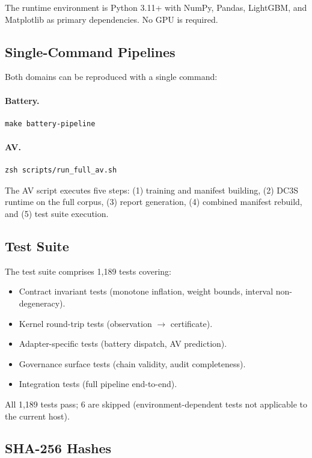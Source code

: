 The runtime environment is Python 3.11+ with NumPy, Pandas, LightGBM, and
Matplotlib as primary dependencies.  No GPU is required.

\subsection{Single-Command Pipelines}

Both domains can be reproduced with a single command:

\paragraph{Battery.}
\begin{verbatim}
make battery-pipeline
\end{verbatim}

\paragraph{AV.}
\begin{verbatim}
zsh scripts/run_full_av.sh
\end{verbatim}

The AV script executes five steps: (1) training and manifest building,
(2) DC3S runtime on the full corpus, (3) report generation, (4) combined manifest
rebuild, and (5) test suite execution.

\subsection{Test Suite}

The test suite comprises 1{,}189 tests covering:
\begin{itemize}[nosep]
  \item Contract invariant tests (monotone inflation, weight bounds, interval
        non-degeneracy).
  \item Kernel round-trip tests (observation $\to$ certificate).
  \item Adapter-specific tests (battery dispatch, AV prediction).
  \item Governance surface tests (chain validity, audit completeness).
  \item Integration tests (full pipeline end-to-end).
\end{itemize}

All 1{,}189 tests pass; 6 are skipped (environment-dependent tests not applicable
to the current host).

\subsection{SHA-256 Hashes}

